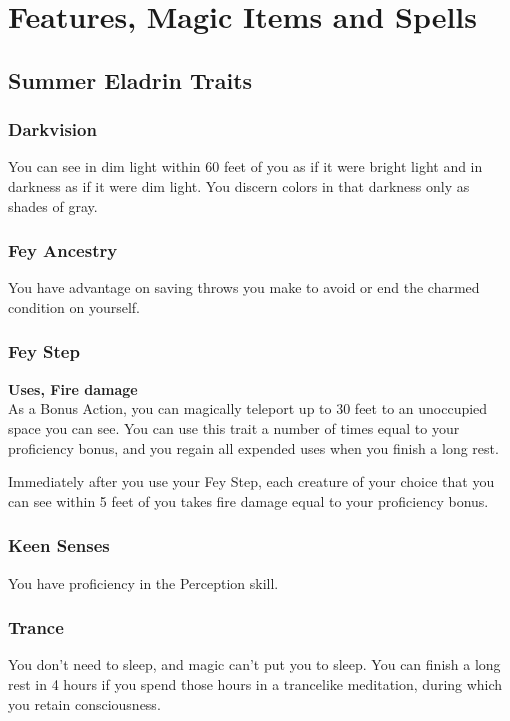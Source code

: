 \documentclass[letterpaper,openany,oneside,twocolumn]{book}
\begin{document}
\onecolumn


\rendercharactersheet

\renderbackgroundsheet

\renderspellsheet


\restoregeometry
\twocolumn

\chapter*{Features, Magic Items and Spells}
\section*{Summer Eladrin Traits}
\subsection*{Darkvision}
You can see in dim light within 60 feet of you as if it were bright light and in darkness as if it were dim light. You discern colors in that darkness only as shades of gray.
\subsection*{Fey Ancestry}
You have advantage on saving throws you make to avoid or end the charmed condition on yourself.
\subsection*{Fey Step}
\textbf{ Uses,  Fire damage}\\
As a Bonus Action, you can magically teleport up to 30 feet to an unoccupied space you can see. You can use this trait a number of times equal to your proficiency bonus, and you regain all expended uses when you finish a long rest.

Immediately after you use your Fey Step, each creature of your choice that you can see within 5 feet of you takes fire damage equal to your proficiency bonus.
\subsection*{Keen Senses}
You have proficiency in the Perception skill.
\subsection*{Trance}
You don't need to sleep, and magic can't put you to sleep. You can finish a long rest in 4 hours if you spend those hours in a trancelike meditation, during which you retain consciousness.
\end{document}
